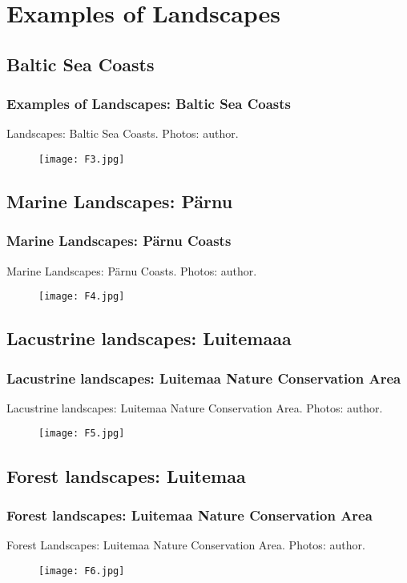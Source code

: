 \documentclass[pdflatex,compress,9pt,
	xcolor={dvipsnames,dvipsnames,svgnames,x11names,table},
	hyperref={colorlinks = true,breaklinks = true, urlcolor = NavyBlue, breaklinks = true}]{beamer}
\begin{document}
\section{Examples of Landscapes}
\subsection{Baltic Sea Coasts}
\begin{frame}\frametitle{Examples of Landscapes: Baltic Sea Coasts}
\begin{examples}{Landscapes:}
Baltic Sea Coasts. Photos: author.
\end{examples}
\begin{figure}[H]
	\centering
		\texttt{[image: F3.jpg]}
\end{figure}
\end{frame}

\subsection{Marine Landscapes: P\"{a}rnu}
\begin{frame}\frametitle{Marine Landscapes: P\"{a}rnu Coasts}
\begin{examples}{Marine Landscapes:}
 P\"{a}rnu Coasts. Photos: author.
\end{examples}
\begin{figure}[H]
	\centering
		\texttt{[image: F4.jpg]}
\end{figure}
\end{frame}

\subsection{Lacustrine landscapes: Luitemaaa}
\begin{frame}\frametitle{Lacustrine landscapes: Luitemaa Nature Conservation Area}
\begin{examples}{Lacustrine landscapes:}
Luitemaa Nature Conservation Area. Photos: author.
\end{examples}
\begin{figure}[H]
	\centering
		\texttt{[image: F5.jpg]}
\end{figure}
\end{frame}

\subsection{Forest landscapes: Luitemaa}
\begin{frame}\frametitle{Forest landscapes: Luitemaa Nature Conservation Area}
\begin{examples}{Forest Landscapes:}
Luitemaa Nature Conservation Area. Photos: author.
\end{examples}
\begin{figure}[H]
	\centering
		\texttt{[image: F6.jpg]}
\end{figure}
\end{frame}
\end{document}
